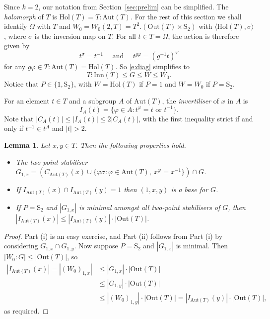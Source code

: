 \documentclass[twoside,a4paper,reqno,11pt]{amsart}
\newcommand{\<}{\langle}
\renewcommand{\>}{\rangle}
\newcommand{\la}{\langle}
\newcommand{\ra}{\rangle}
\newcommand{\leqs}{\leqslant}
\newcommand{\Aut}{\mathrm{Aut}}
\newcommand{\Inn}{\mathrm{Inn}}
\newcommand{\Out}{\mathrm{Out}}
\newcommand{\Hol}{\mathrm{Hol}}
\newcommand{\Sn}{\mathrm{S}}
\newtheorem{lem}[thm]{Lemma}
\theoremstyle{definition}
\begin{document}
Since $k = 2$, our notation from Section~\ref{sec:prelim} can be simplified.
The \textit{holomorph} of $T$ is $\Hol(T) = T{:}\Aut(T)$. 
For the rest of this section we shall identify $\Omega$ with $T$ and $W_0 = W_0(2, T) = T^2.(\Out(T)\times  \Sn_2)$ with $\la\Hol(T),\sigma\ra$, where $\sigma$ is the inversion map on $T$. For all $t \in T = \Omega$, the action is therefore given by
\begin{equation}\label{e:k=2_act}
t^\sigma = t^{-1} \quad \mbox{ and } \quad t^{g\varphi} = (g^{-1}t)^\varphi
\end{equation}
for any $g\varphi \in T{:}\Aut(T) = \Hol(T)$. So \eqref{e:diag} simplifies to
\begin{equation*}
T{:}\Inn(T)\leqs G\leqs W \leqs W_0.
\end{equation*}
Notice that $P \in \{1, \Sn_2\}$, with $W = \Hol(T)$ if $P = 1$ and $W = W_0$ if $P = \Sn_2$.

For an element $t\in T$ and a subgroup $A$ of $\Aut(T)$,  the \emph{invertiliser} of $x$ in $A$ is
\begin{equation*}
I_{A}(t) = \{\varphi\in A:t^\varphi = t \mbox{ or }t^{-1}\}.
\end{equation*}
Note that $|C_{A}(t)|\leqs |I_{A}(t)|\leqs 2|C_{A}(t)|$, with the first inequality strict if and only if $t^{-1}\in t^{A}$ and $|t| > 2$.

\begin{lem}
    \label{l:k=2_stabiliser}
    Let $x,y\in T$. Then the following properties hold.
    \begin{itemize}\addtolength{\itemsep}{0.2\baselineskip}
		\item[{\rm (i)}] The two-point stabiliser $G_{1,x} = (C_{\Aut(T)}(x)\cup \{\varphi\sigma:\varphi\in \Aut(T), \ x^{\varphi} = x^{-1}\})\cap G$.
		\item[{\rm (ii)}] If $I_{\Aut(T)}(x)\cap I_{\Aut(T)}(y) = 1$ then $(1,x,y)$ is a base for $G$.
		\item[{\rm (iii)}] If $P = \Sn_2$ and $|G_{1,x}|$ is minimal amongst all two-point stabilisers of $G$, then $|I_{\Aut(T)}(x)| \leqs |I_{\Aut(T)}(y)|\cdot |\Out(T)|$.
	\end{itemize}
\end{lem}

\begin{proof}
    Part (i) is an easy exercise, and Part (ii) follows from Part (i) by considering $G_{1,x} \cap G_{1, y}$. Now suppose $P = \Sn_2$ and $|G_{1,x}|$ is minimal. Then $|W_0:G|\leqs |\Out(T)|$, so
    \begin{equation*}
    \begin{aligned}
        |I_{\Aut(T)}(x)| = |(W_0)_{1,x}| &\leqs |G_{1,x}|\cdot |\Out(T)|\\&\leqs |G_{1,y}|\cdot |\Out(T)| \\&\leqs |(W_0)_{1,y}|\cdot |\Out(T)| = |I_{\Aut(T)}(y)|\cdot |\Out(T)|,
    \end{aligned}
    \end{equation*}
as required.
\end{proof}
\end{document}
